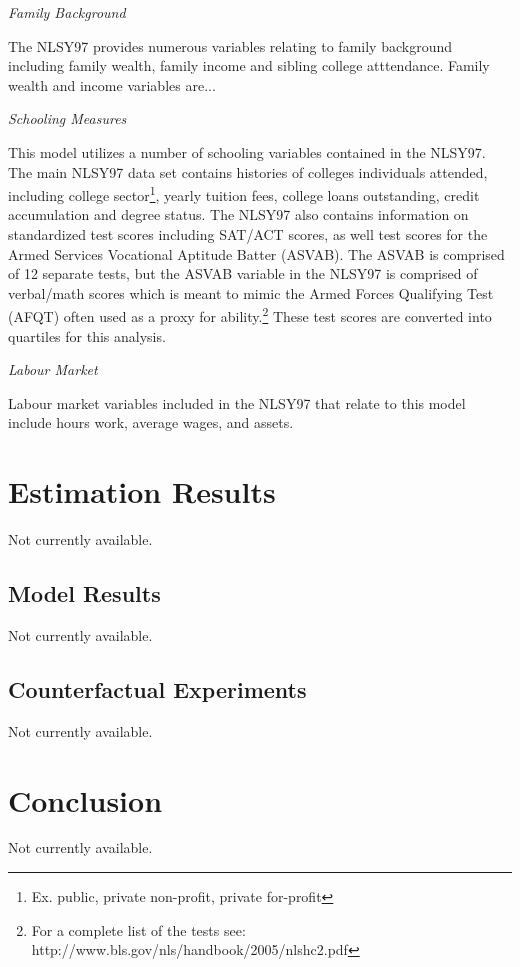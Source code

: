 \documentclass[letterpaper,12pt]{article}
\newlength{\defbaselineskip}
\newcommand{\singlespacing}{\setlength{\baselineskip}{\defbaselineskip}}
\begin{document}
\noindent \emph{Family Background}

The NLSY97  provides numerous variables relating to family background including family wealth, family income and sibling college atttendance. Family wealth and income variables are... 

\noindent \emph{Schooling Measures}

This model utilizes a number of schooling variables contained in the NLSY97. The main NLSY97 data set contains histories of colleges individuals attended, including college sector\footnote{Ex. public, private non-profit, private for-profit}, yearly tuition fees, college loans outstanding, credit accumulation and degree status. The NLSY97 also contains information on standardized test scores including SAT/ACT scores, as well test scores for the Armed Services Vocational Aptitude Batter (ASVAB). The ASVAB is comprised of 12 separate tests, but the ASVAB variable in the NLSY97 is comprised of verbal/math scores which is meant to mimic the Armed Forces Qualifying Test (AFQT) often used as a proxy for ability.\footnote{For a complete list of the tests see: http://www.bls.gov/nls/handbook/2005/nlshc2.pdf}  These test scores are converted into quartiles for this analysis. 

\noindent \emph{Labour Market}

Labour market variables included in the NLSY97 that relate to this model include hours work, average wages, and assets. 


\section{Estimation Results}

Not currently available. 

\subsection{Model Results}

Not currently available. 

\subsection{Counterfactual Experiments}

Not currently available. 

\section{Conclusion}

Not currently available. 

\newpage
\singlespacing
\nocite{*}
%


\end{document}
